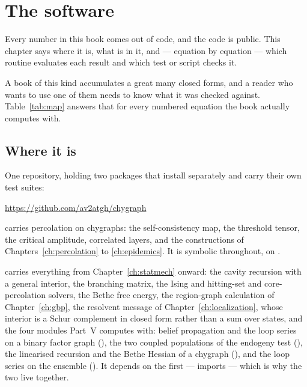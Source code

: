 \chapter*{The software}

Every number in this book comes out of code, and the code is public. This
chapter says where it is, what is in it, and --- equation by equation --- which
routine evaluates each result and which test or script checks it.

A book of this kind accumulates a great many closed forms, and a reader who
wants to use one of them needs to know what it was checked against. Table~\ref{tab:map} answers that for every
numbered equation the book actually computes with.

\section*{Where it is}

One repository, holding two packages that install separately and carry their
own test suites:

\begin{center}
\small\url{https://github.com/av2atgh/chygraph}
\end{center}

\noindent
{} carries percolation on chygraphs: the self-con\-sis\-tency map,
the threshold tensor, the critical amplitude, correlated layers, and the
constructions of Chapters~\ref{ch:percolation} to \ref{ch:epidemics}. It is
symbolic throughout, on .

 carries everything from Chapter~\ref{ch:statmech} onward: the
cavity recursion with a general interior, the branching matrix, the Ising and
hitting-set and core-percolation solvers, the Bethe free energy, the
region-graph calculation of Chapter~\ref{ch:gbp}, the resolvent message
of Chapter~\ref{ch:localization}, whose interior is a Schur complement in
closed form rather than a sum over states, and the four modules Part~V
computes with: belief propagation and the loop series on a binary factor
graph (), the two coupled populations of the endogeny
test (), the linearised recursion and the Bethe Hessian of
a chygraph (), and the loop series on the ensemble
(). It depends on the first ---
 imports 
--- which is why the two live together.

